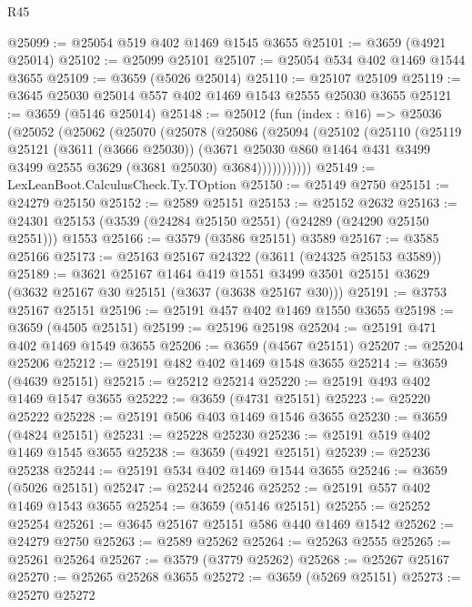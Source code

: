 \begin{lexlean}{R45}
\begin{coremodule}
@25099 := @25054 @519 @402 @1469 @1545 @3655
@25101 := @3659 (@4921 @25014)
@25102 := @25099 @25101
@25107 := @25054 @534 @402 @1469 @1544 @3655
@25109 := @3659 (@5026 @25014)
@25110 := @25107 @25109
@25119 := @3645 @25030 @25014 @557 @402 @1469 @1543 @2555 @25030 @3655
@25121 := @3659 (@5146 @25014)
@25148 := @25012
    (fun (index : @16) =>
    @25036
      (@25052
        (@25062
          (@25070
            (@25078
              (@25086
                (@25094
                  (@25102
                    (@25110
                      (@25119
                        @25121
                        (@3611 (@3666 @25030))
                        (@3671
                          @25030
                          @860
                          @1464
                          @431
                          @3499
                          @3499
                          @2555
                          @3629
                          (@3681 @25030)
                          @3684)))))))))))
@25149 := LexLeanBoot.CalculusCheck.Ty.TOption
@25150 := @25149 @2750
@25151 := @24279 @25150
@25152 := @2589 @25151
@25153 := @25152 @2632
@25163 := @24301 @25153 (@3539 (@24284 @25150 @2551) (@24289 (@24290 @25150 @2551))) @1553
@25166 := @3579 (@3586 @25151) @3589
@25167 := @3585 @25166
@25173 := @25163 @25167 @24322 (@3611 (@24325 @25153 @3589))
@25189 := @3621
    @25167
    @1464
    @419
    @1551
    @3499
    @3501
    @25151
    @3629
    (@3632 @25167 @30 @25151 (@3637 (@3638 @25167 @30)))
@25191 := @3753 @25167 @25151
@25196 := @25191 @457 @402 @1469 @1550 @3655
@25198 := @3659 (@4505 @25151)
@25199 := @25196 @25198
@25204 := @25191 @471 @402 @1469 @1549 @3655
@25206 := @3659 (@4567 @25151)
@25207 := @25204 @25206
@25212 := @25191 @482 @402 @1469 @1548 @3655
@25214 := @3659 (@4639 @25151)
@25215 := @25212 @25214
@25220 := @25191 @493 @402 @1469 @1547 @3655
@25222 := @3659 (@4731 @25151)
@25223 := @25220 @25222
@25228 := @25191 @506 @403 @1469 @1546 @3655
@25230 := @3659 (@4824 @25151)
@25231 := @25228 @25230
@25236 := @25191 @519 @402 @1469 @1545 @3655
@25238 := @3659 (@4921 @25151)
@25239 := @25236 @25238
@25244 := @25191 @534 @402 @1469 @1544 @3655
@25246 := @3659 (@5026 @25151)
@25247 := @25244 @25246
@25252 := @25191 @557 @402 @1469 @1543 @3655
@25254 := @3659 (@5146 @25151)
@25255 := @25252 @25254
@25261 := @3645 @25167 @25151 @586 @440 @1469 @1542
@25262 := @24279 @2750
@25263 := @2589 @25262
@25264 := @25263 @2555
@25265 := @25261 @25264
@25267 := @3579 (@3779 @25262)
@25268 := @25267 @25167
@25270 := @25265 @25268 @3655
@25272 := @3659 (@5269 @25151)
@25273 := @25270 @25272

\end{coremodule}
\end{lexlean}
